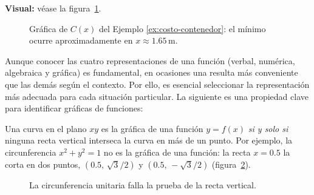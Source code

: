 \begin{example}
\begin{myproof}
\textbf{Visual:} véase la figura~\ref{fig:costo_contenedor}.
\begin{figure}[H]
\centering
{}
\caption{Gráfica de $C(x)$ del Ejemplo \ref{ex:costo-contenedor}: el mínimo ocurre aproximadamente en $x \approx 1.65\,\mathrm{m}$.}
\label{fig:costo_contenedor}
\end{figure}
\end{myproof}
\end{example}

Aunque conocer las cuatro representaciones de una función (verbal, numérica, algebraica y gráfica) es fundamental, en ocasiones una resulta más conveniente que las demás según el contexto. Por ello, es esencial seleccionar la representación más adecuada para cada situación particular. La siguiente es una propiedad clave para identificar gráficas de funciones:

\begin{rem}
Una curva en el plano $xy$ es la gráfica de una función $y = f(x)$ \emph{si y solo si} ninguna recta vertical interseca la curva en más de un punto. Por ejemplo, la circunferencia $x^2 + y^2 = 1$ no es la gráfica de una función: la recta $x = 0.5$ la corta en dos puntos, $(0.5,\,\sqrt{3}/2)$ y $(0.5,\,-\sqrt{3}/2)$ (figura~\ref{fig:recta_vertical}).

\begin{figure}[!htbp]
\centering
{}
\caption{La circunferencia unitaria falla la prueba de la recta vertical.}
\label{fig:recta_vertical}
\end{figure}
\end{rem}


